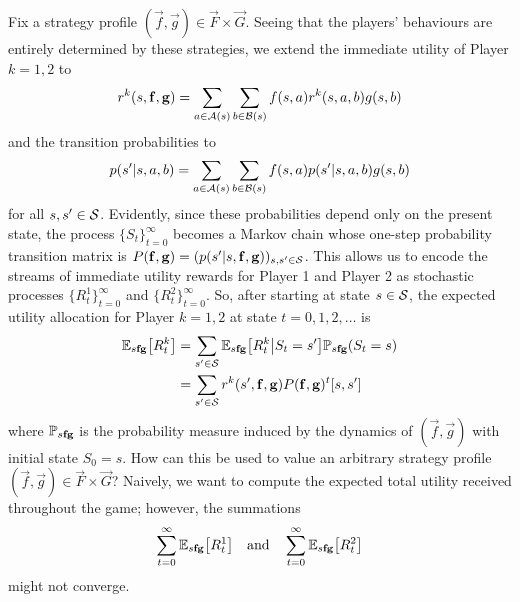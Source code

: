     Fix a strategy profile $(\vec{f}, \vec{g}) \in \vec{F} \times \vec{G}$.
    Seeing that the players' behaviours are entirely determined by these strategies, we extend the immediate utility of Player $k = 1, 2$ to
    \begin{equation}  \label{eq:expected-immediate-utility}
        r^k(s, \mathbf{f}, \mathbf{g})
            = \sum_{a \in \mathcal{A}(s)} \sum_{b \in \mathcal{B}(s)} f(s, a) r^k(s, a, b) g(s, b)
    \end{equation}
    and the transition probabilities to
    \begin{equation}  \label{eq:expected-transition-probabilities}
        p(s' | s, a, b)
            = \sum_{a \in \mathcal{A}(s)} \sum_{b \in \mathcal{B}(s)} f(s, a) p(s' | s, a, b) g(s, b)
    \end{equation}
    for all $s, s' \in \mathcal{S}$.
    Evidently, since these probabilities depend only on the present state, the process $\{S_t\}_{t = 0}^\infty$ becomes a Markov chain whose one-step probability transition matrix is $P(\mathbf{f}, \mathbf{g}) = (p(s' | s, \mathbf{f}, \mathbf{g}))_{s, s' \in \mathcal{S}}$.
    This allows us to encode the streams of immediate utility rewards for Player 1 and Player 2 as stochastic processes $\{R^1_t\}_{t = 0}^\infty$ and $\{R^2_t\}_{t = 0}^\infty$.
    So, after starting at state $s \in \mathcal{S}$, the expected utility allocation for Player $k = 1, 2$ at state $t = 0, 1, 2, \ldots$ is
    \begin{equation}  \label{eq:utility-process-expectation}
    \begin{split} 
        \mathbb{E}_{s \mathbf{f} \mathbf{g}} \big[R^k_t\big]
            & = \sum_{s' \in \mathcal{S}} \mathbb{E}_{s \mathbf{f} \mathbf{g}} \big[ R^k_t \big| S_t = s' \big] \mathbb{P}_{s \mathbf{f} \mathbf{g}} (S_t = s) \\
            & = \sum_{s' \in \mathcal{S}} r^k(s', \mathbf{f}, \mathbf{g}) P(\mathbf{f}, \mathbf{g})^t [s, s']
    \end{split}
    \end{equation}
    where $\mathbb{P}_{s \mathbf{f} \mathbf{g}}$ is the probability measure induced by the dynamics of $(\vec{f}, \vec{g})$ with initial state $S_0 = s$.
    How can this be used to value an arbitrary strategy profile $(\vec{f}, \vec{g}) \in \vec{F} \times \vec{G}$?
    Naively, we want to compute the expected total utility received throughout the game; however, the summations
    \[
        \sum_{t = 0}^\infty \mathbb{E}_{s \mathbf{f} \mathbf{g}} \big[ R^1_t \big]
        \quad\text{and}\quad
        \sum_{t = 0}^\infty \mathbb{E}_{s \mathbf{f} \mathbf{g}} \big[ R^2_t \big]
    \]
    might not converge.

